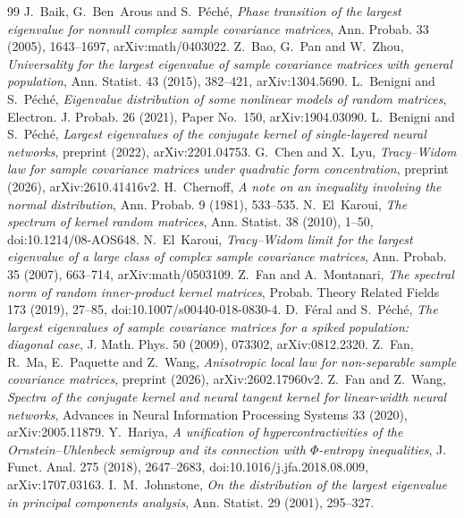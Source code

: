 \documentclass[11pt]{amsart}
\theoremstyle{remark}
\numberwithin{equation}{section}
\begin{document}
\begin{thebibliography}{99}
 J.~Baik, G.~Ben~Arous and S.~P\'ech\'e, \emph{Phase transition of the largest eigenvalue for nonnull complex sample covariance matrices}, Ann. Probab. 33 (2005), 1643--1697, arXiv:math/0403022.
 Z.~Bao, G.~Pan and W.~Zhou, \emph{Universality for the largest eigenvalue of sample covariance matrices with general population}, Ann. Statist. 43 (2015), 382--421, arXiv:1304.5690.
 L.~Benigni and S.~P\'eché, \emph{Eigenvalue distribution of some nonlinear models of random matrices}, Electron. J. Probab. 26 (2021), Paper No.~150, arXiv:1904.03090.
 L.~Benigni and S.~P\'eché, \emph{Largest eigenvalues of the conjugate kernel of single-layered neural networks}, preprint (2022), arXiv:2201.04753.
 G.~Chen and X.~Lyu, \emph{Tracy--Widom law for sample covariance matrices under quadratic form concentration}, preprint (2026), arXiv:2610.41416v2.
 H.~Chernoff, \emph{A note on an inequality involving the normal distribution}, Ann. Probab. 9 (1981), 533--535.
 N.~El~Karoui, \emph{The spectrum of kernel random matrices}, Ann. Statist. 38 (2010), 1--50, doi:10.1214/08-AOS648.
 N.~El~Karoui, \emph{Tracy--Widom limit for the largest eigenvalue of a large class of complex sample covariance matrices}, Ann. Probab. 35 (2007), 663--714, arXiv:math/0503109.
 Z.~Fan and A.~Montanari, \emph{The spectral norm of random inner-product kernel matrices}, Probab. Theory Related Fields 173 (2019), 27--85, doi:10.1007/s00440-018-0830-4.
 D.~F\'eral and S.~P\'ech\'e, \emph{The largest eigenvalues of sample covariance matrices for a spiked population: diagonal case}, J. Math. Phys. 50 (2009), 073302, arXiv:0812.2320.
 Z.~Fan, R.~Ma, E.~Paquette and Z.~Wang, \emph{Anisotropic local law for non-separable sample covariance matrices}, preprint (2026), arXiv:2602.17960v2.
 Z.~Fan and Z.~Wang, \emph{Spectra of the conjugate kernel and neural tangent kernel for linear-width neural networks}, Advances in Neural Information Processing Systems 33 (2020), arXiv:2005.11879.
 Y.~Hariya, \emph{A unification of hypercontractivities of the Ornstein--Uhlenbeck semigroup and its connection with $\Phi$-entropy inequalities}, J. Funct. Anal. 275 (2018), 2647--2683, doi:10.1016/j.jfa.2018.08.009, arXiv:1707.03163.
 I.~M.~Johnstone, \emph{On the distribution of the largest eigenvalue in principal components analysis}, Ann. Statist. 29 (2001), 295--327.

\end{thebibliography}
\end{document}

